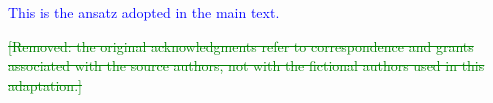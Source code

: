 \documentclass [prd,reprint,eqsecnum,nofootinbib]  {revtex4-1}
\newcommand{\corr}[1]{\textcolor{blue}{#1}}
\newcommand{\del}[1]{\textcolor{green}{\sout{#1}}}
\begin{document}
\corr{This is the ansatz adopted in the main text.}



\del{[Removed: the original acknowledgments refer to correspondence and grants associated with the source authors, not with the fictional authors used in this adaptation.]}
\end{document}
